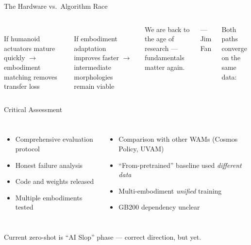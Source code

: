 \begin{frame}{The Hardware vs.\ Algorithm Race}
\begin{columns}[T]
\\
If humanoid actuators mature quickly
$\rightarrow$ embodiment matching removes transfer loss

\vspace{0.5em}
\\
If embodiment adaptation improves faster
$\rightarrow$ intermediate morphologies remain viable

\begin{quotebox}
We are back to the age of research ---
fundamentals matter again.
\end{quotebox}
\hfill --- Jim Fan \citep{fan2026secondparadigm}

\vspace{0.5em}
Both paths converge on the same data:\\
\end{columns}
\end{frame}

\begin{frame}{Critical Assessment}
\begin{columns}[T]
\begin{itemize}
    \item[\positive{\checkmark}] Comprehensive evaluation protocol
    \item[\positive{\checkmark}] Honest failure analysis
    \item[\positive{\checkmark}] Code and weights released
    \item[\positive{\checkmark}] Multiple embodiments tested
\end{itemize}

\begin{itemize}
    \item Comparison with other WAMs
          (Cosmos Policy, UVAM)
    \item ``From-pretrained'' baseline used
          \emph{different data}
    \item Multi-embodiment \emph{unified} training
    \item GB200 dependency unclear
\end{itemize}
\end{columns}

\vspace{0.3em}
\begin{softbox}
 Current zero-shot is ``AI Slop'' phase
\citep{jang2026worldmodels} --- correct direction, but
 yet.
\end{softbox}
\end{frame}

